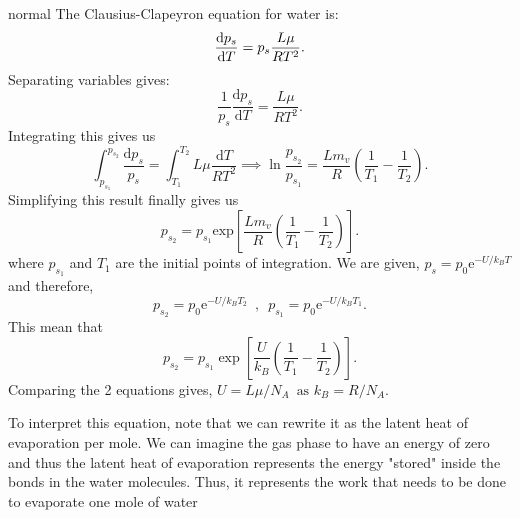 \begin{solution}{normal}
The Clausius-Clapeyron equation for water is:
\[\dv{p_s}{T} = p_s \frac{L\mu}{RT^2}.\]
Separating variables gives:
$$\frac{1}{p_s} \frac{\text {d}p_s}{\text {d}T}= \frac{L\mu}{RT^2}.$$
Integrating this gives us
\[\int_{p_{s_1}}^{p_{s_2}} \frac{\text{d}p_s}{p_s}= \int_{T_1}^{T_2} L\mu \frac{\text{d}T}{RT^2} \implies \ln \frac{p_{s_2}}{p_{s_1}} = \frac{Lm_v}{R}\left(\frac{1}{T_1}-\frac{1}{T_2}\right).\]Simplifying this result finally gives us
\[p_{s_2} = p_{s_1}\text{exp}\left[\frac{Lm_v}{R}\left(\frac{1}{T_1} - \frac{1}{T_2}\right)\right].\]where $p_{s_1}$ and $T_1$ are the initial points of integration. We are given, $p_s = p_0 \text{e}^{-U/k_B T}$ and therefore, 
\[ p_{s_2} = p_0 \text{e}^{-U/k_B T_2}\,\,\,,\,\,\,p_{s_1} = p_0 \text{e}^{-U/k_B T_1}.\]
This mean that 
\[p_{s_2} = p_{s_1} \exp \left[\frac{U}{k_B} \left(\frac{1}{T_1}-\frac{1}{T_2}\right)\right].\]
Comparing the 2 equations gives, $\boxed{U=L\mu/N_A}\,\,\, \text{as} \,\,k_B=R/N_A$. 
\vspace{3mm}

\noindent To interpret this equation, note that we can rewrite it as the latent heat of evaporation per mole. We can imagine the gas phase to have an energy of zero and thus the latent heat of evaporation represents the energy "stored" inside the bonds in the water molecules. Thus, it represents the work that needs to be done to evaporate one mole of water

\end{solution}
